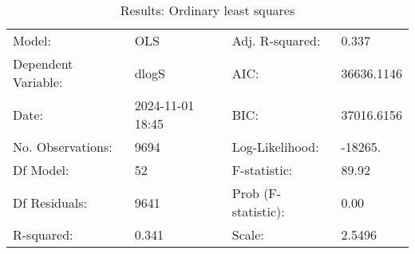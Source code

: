 \begin{table}
\caption{Results: Ordinary least squares}
\label{}
\begin{center}
\begin{tabular}{llll}
\hline
Model:              & OLS              & Adj. R-squared:     & 0.337       \\
Dependent Variable: & dlogS            & AIC:                & 36636.1146  \\
Date:               & 2024-11-01 18:45 & BIC:                & 37016.6156  \\
No. Observations:   & 9694             & Log-Likelihood:     & -18265.     \\
Df Model:           & 52               & F-statistic:        & 89.92       \\
Df Residuals:       & 9641             & Prob (F-statistic): & 0.00        \\
R-squared:          & 0.341            & Scale:              & 2.5496      \\
\hline
\end{tabular}
\end{center}


\end{table}
